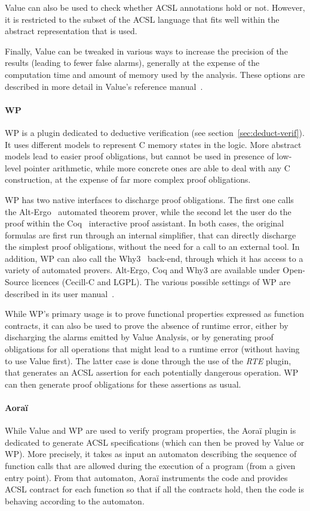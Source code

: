 Value can also be used to check whether ACSL annotations hold or
not. However, it is restricted to the subset of the ACSL language that
fits well within the abstract representation that is used.

Finally, Value can be tweaked in various ways to increase the
precision of the results (leading to fewer false alarms), generally at
the expense of the computation time and amount of memory used by the
analysis. These options are described in more detail in Value's
reference manual~\cite{frama-c-va}.

\paragraph{WP} 
WP is a plugin dedicated to deductive verification 
(see section~\ref{sec:deduct-verif}). It uses different models 
to represent C memory states in the logic. More abstract models lead to easier
proof obligations, but cannot be used in presence of low-level pointer 
arithmetic, while more concrete ones are able to deal with any C construction,
at the expense of far more complex proof obligations.

WP has two native interfaces to discharge proof obligations. The first one calls
the Alt-Ergo~\cite{alt-ergo} automated theorem prover, while the second let the
user do the proof within the Coq~\cite{coq} interactive proof assistant. In
both cases, the original formulas are first run through an internal simplifier,
that can directly discharge the simplest proof obligations, without the need
for a call to an external tool. In addition, WP can also call the
Why3~\cite{why3} back-end, through which it has access to a
variety of automated provers. Alt-Ergo, Coq and Why3 are available
under Open-Source licences (Cecill-C and LGPL). The various possible settings
of WP are described in its user manual~\cite{WP}.

While WP's primary usage is to prove functional properties expressed as 
function contracts, it can also be used to prove the absence of runtime error,
either by discharging the alarms emitted by Value Analysis, or by generating
proof obligations for all operations that might lead to a runtime error 
(without having to use Value first). The latter case is done through the use
of the \emph{RTE} plugin, that generates an ACSL assertion for each potentially
dangerous operation. WP can then generate proof obligations for these assertions
as usual.

\paragraph{Aora\"i}
While Value and WP are used to verify program properties, the Aora\"i
plugin is dedicated to generate ACSL specifications (which can then be
proved by Value or WP). More precisely, it takes as input an automaton
describing the sequence of function calls that are allowed during the
execution of a program (from a given entry point). From that
automaton, Aora\"i instruments the code and provides ACSL contract for
each function so that if all the contracts hold, then the code is
behaving according to the automaton.

